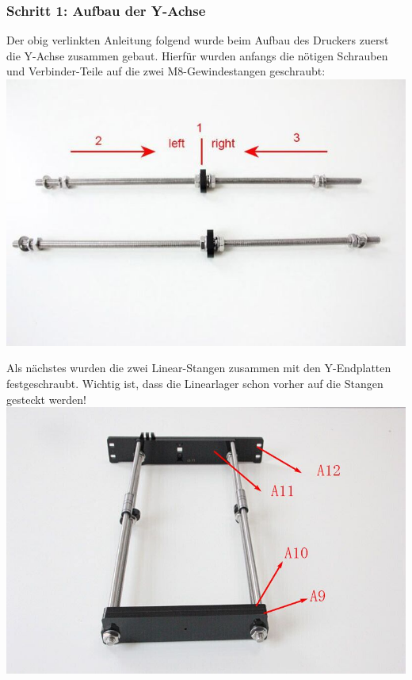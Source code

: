 \newpage
\subsubsection{Schritt 1: Aufbau der Y-Achse}
Der obig verlinkten Anleitung folgend wurde beim Aufbau des Druckers zuerst die Y-Achse zusammen gebaut.
Hierfür wurden anfangs die nötigen Schrauben und Verbinder-Teile auf die zwei M8-Gewindestangen geschraubt:
\includegraphics[clip=true,trim=0 100 0 40,width=\textwidth]{Bilder/Y_Assembly_Tutorial_1.jpg}

Als nächstes wurden die zwei Linear-Stangen zusammen mit den Y-Endplatten festgeschraubt. Wichtig ist, dass die Linearlager schon vorher auf die Stangen gesteckt werden!\\
\includegraphics[width=\textwidth]{Bilder/Y_Assembly_Tutorial_2.jpg}

